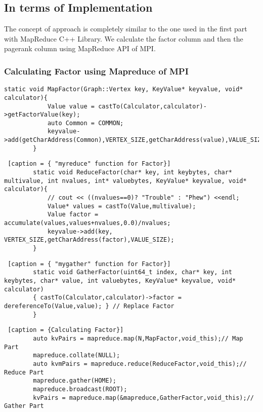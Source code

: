 \documentclass{article}
\begin{document}
    \clearpage
    
    \subsection{In terms of Implementation}  
    
    The concept of approach is completely similar to the one used in the first part with MapReduce C++ Library. We calculate the factor column and then the pagerank column using MapReduce API of MPI. 
    
    \subsubsection{Calculating Factor using Mapreduce of MPI}
    \begin{lstlisting}[caption={ "mymap" function for Factor}] 
        static void MapFactor(Graph::Vertex key, KeyValue* keyvalue, void* calculator){
            Value value = castTo(Calculator,calculator)->getFactorValue(key);
            auto Common = COMMON;
            keyvalue->add(getCharAddress(Common),VERTEX_SIZE,getCharAddress(value),VALUE_SIZE);
        }
    \end{lstlisting}
    
    \begin{lstlisting} [caption = { "myreduce" function for Factor}]
        static void ReduceFactor(char* key, int keybytes, char* multivalue, int nvalues, int* valuebytes, KeyValue* keyvalue, void* calculator){ 
            // cout << ((nvalues==0)? "Trouble" : "Phew") <<endl;
            Value* values = castTo(Value,multivalue);    
            Value factor = accumulate(values,values+nvalues,0.0)/nvalues;
            keyvalue->add(key, VERTEX_SIZE,getCharAddress(factor),VALUE_SIZE);
        }
    \end{lstlisting}

    \begin{lstlisting} [caption = { "mygather" function for Factor}]
        static void GatherFactor(uint64_t index, char* key, int keybytes, char* value, int valuebytes, KeyValue* keyvalue, void* calculator)
        { castTo(Calculator,calculator)->factor = dereferenceTo(Value,value); } // Replace Factor
        }
    \end{lstlisting}
    
    \begin{lstlisting} [caption = {Calculating Factor}]
        auto kvPairs = mapreduce.map(N,MapFactor,void_this);// Map Part
        mapreduce.collate(NULL);
        auto kvmPairs = mapreduce.reduce(ReduceFactor,void_this);// Reduce Part
        mapreduce.gather(HOME);
        mapreduce.broadcast(ROOT);
        kvPairs = mapreduce.map(&mapreduce,GatherFactor,void_this);// Gather Part
    \end{lstlisting}
    
\end{document}

